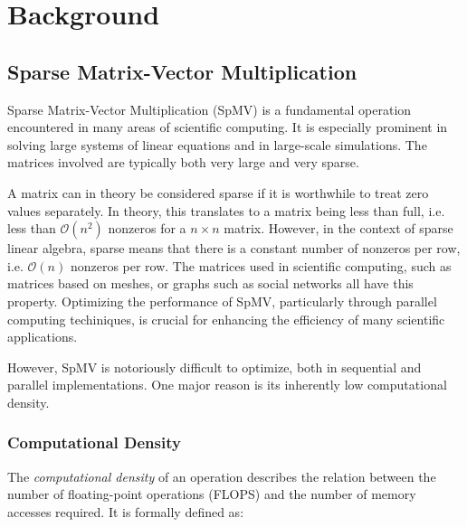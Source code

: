 \chapter{Background}

\section{Sparse Matrix-Vector Multiplication}

Sparse Matrix-Vector Multiplication (SpMV) is a fundamental operation encountered in many areas of scientific computing. It is especially prominent in solving large systems of linear equations and in large-scale simulations. The matrices involved are typically both very large and very sparse. 

A matrix can in theory be considered sparse if it is worthwhile to treat zero values separately. In theory, this translates to a matrix being less than full, i.e. less than \( \mathcal{O}\left(n^2\right)\) nonzeros for a \(n \times  n\) matrix. However, in the context of sparse linear algebra, sparse means that there is a constant number of nonzeros per row, i.e. \(\mathcal{O}\left(n\right)\) nonzeros per row. The matrices used in scientific computing, such as matrices based on meshes, or graphs such as social networks all have this property. Optimizing the performance of SpMV, particularly through parallel computing techiniques, is crucial for enhancing the efficiency of many scientific applications.


However, SpMV is notoriously difficult to optimize, both in sequential and parallel implementations. One major reason is its inherently low computational density.

\subsection{Computational Density}

The \textit{computational density} of an operation describes the relation between the number of floating-point operations (FLOPS) and the number of memory accesses required. It is formally defined as:

